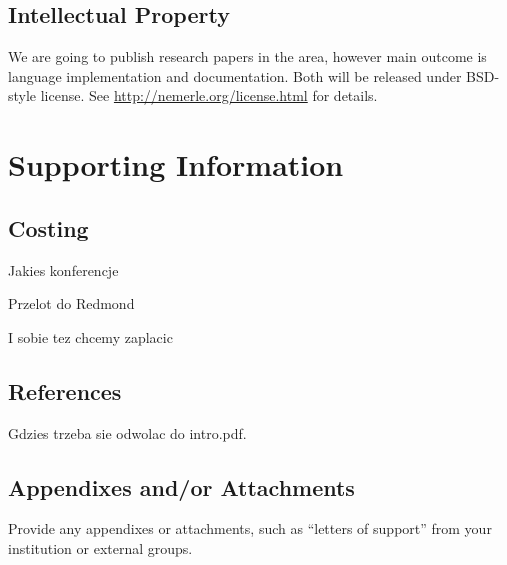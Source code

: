 \documentclass[a4paper,11pt]{article}
\begin{document}
\subsection{Intellectual Property}

We are going to publish research papers in the area, however main outcome
is language implementation and documentation. Both will be released
under BSD-style license. See \url{http://nemerle.org/license.html}
for details.


\section{Supporting Information}


\subsection{Costing}

Jakies konferencje

Przelot do Redmond

I sobie tez chcemy zaplacic


\subsection{References}

Gdzies trzeba sie odwolac do intro.pdf.


\subsection{Appendixes and/or Attachments}

Provide any appendixes or attachments, such as ``letters of support''
from your institution or external groups.
\end{document}
